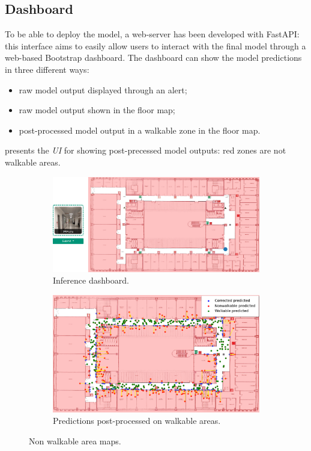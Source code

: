 \subsection{Dashboard}
To be able to deploy the model, a web-server has been developed with FastAPI: this interface aims to easily allow users to interact with the final model through a web-based Bootstrap dashboard.
The dashboard can show the model predictions in three different ways:
\begin{itemize}
    \item raw model output displayed through an alert;
    \item raw model output shown in the floor map;
    \item post-processed model output in a walkable zone in the floor map.
\end{itemize}
 presents the \textit{UI} for showing post-precessed model outputs: red zones are not walkable areas.
\begin{figure}[htbp]
    \begin{subfigure}[b]{0.542\textwidth}
        \includegraphics[width=1\textwidth]{./imgs/dashboard.png}
        \caption{Inference dashboard.}
        \label{fig:dashboard}
    \end{subfigure}
    \hfill
    \begin{subfigure}[b]{0.438\textwidth}
        \includegraphics[width=1\textwidth]{./imgs/walkable_postprocess.png}
        \caption{Predictions post-processed on walkable areas.}
        \label{fig:trajectory-mapnet-walkable}
    \end{subfigure}
    \caption{Non walkable area maps.}
\end{figure}
